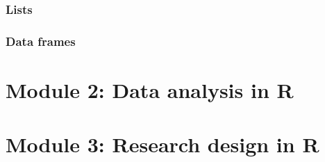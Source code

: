 \documentclass{beamer}
\begin{document}
\begin{frame}[fragile]
    \frametitle{Lists}
    \fontsize{11pt}{10}\selectfont
    
\end{frame}


\begin{frame}[fragile]
    \frametitle{Data frames}
    
\end{frame}






\section{Module 2: Data analysis in R}




\section{Module 3: Research design in R}




\end{document}
